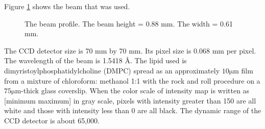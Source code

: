\documentclass[letterpaper,12pt]{article}
\begin{document}
Figure \ref{fig:beam} shows the beam that was used. 
\begin{figure}[htbp]
	\caption[The beam profile]{The beam profile. The beam height = 0.88 mm. The width = 0.61 mm.}
	\label{fig:beam}
\end{figure}
The CCD detector size is 70 mm by 70 mm. Its pixel size is 0.068 mm per pixel. The wavelength of the beam is 1.5418 \AA. The lipid used is dimyristoylphosphatidylcholine (DMPC) spread as an approximately $10\mathrm{\mu m}$ film from a mixture of chloroform: methanol 1:1 with the rock and roll procedure on a $75\mathrm{\mu m}$-thick glass coverslip. When the color scale of intensity map is written as [minimum maximum] in gray scale, pixels with intensity greater than 150 are all white and those with intensity less than 0 are all black. The dynamic range of the CCD detector is about 65,000.

\newpage
\end{document}
